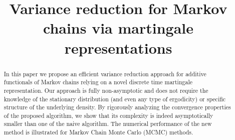\documentclass[bj]{imsart}
\begin{document}
\begin{frontmatter}
\title{Variance reduction for Markov chains via martingale representations}



\begin{abstract}
In this paper we propose an efficient variance reduction approach for  additive functionals of Markov chains relying on a novel discrete time martingale representation. Our approach is fully non-asymptotic and does not require the knowledge of the stationary distribution (and even any type of ergodicity) or specific structure of the underlying density.  By rigorously analyzing the  convergence properties of the proposed algorithm, we show that its complexity is indeed asymptotically smaller than one of the naive algorithm. The numerical performance of the new method is illustrated for Markov Chain Monte Carlo (MCMC) methods.
\end{abstract}

\begin{keyword}[class=MSC]
\end{keyword}

\begin{keyword}
\end{keyword}

\end{frontmatter}
\end{document}
